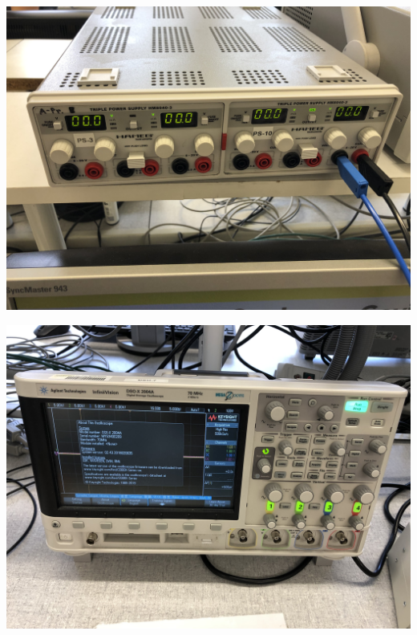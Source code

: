 \documentclass[11pt,ngerman]{scrartcl}
\begin{document}
\begin{minipage}{\textwidth}
	\begin{minipage}[t]{0.5\textwidth}
		\centering
		\includegraphics[width=\textwidth]{hameg}
		\label{fig:hameg}
	\end{minipage}
	\vspace{2mm}
	\begin{minipage}[t]{0.50\textwidth}
		\centering
		\includegraphics[width=\textwidth]{oszi}
		\label{fig:oszi}
	\end{minipage}
	\vspace{1em}
\end{minipage}
\end{document}
